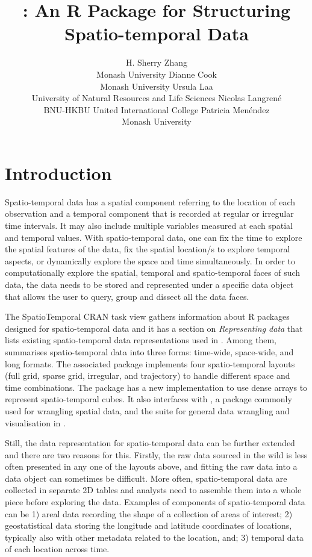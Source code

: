 \documentclass[
]{jss}
\author{
H. Sherry Zhang\\Monash University \And Dianne Cook\\Monash University \AND Ursula Laa\\University of Natural Resources and Life Sciences \AND Nicolas Langrené\\BNU-HKBU United International College \And Patricia Menéndez\\Monash University
}
\title{\pkg{cubble}: An R Package for Structuring Spatio-temporal Data}
\begin{document}
\newpage

\hypertarget{introduction}{%
\section{Introduction}\label{introduction}}

Spatio-temporal data has a spatial component referring to the location of each observation and a temporal component that is recorded at regular or irregular time intervals. It may also include multiple variables measured at each spatial and temporal values. With spatio-temporal data, one can fix the time to explore the spatial features of the data, fix the spatial location/s to explore temporal aspects, or dynamically explore the space and time simultaneously.
In order to computationally explore the spatial, temporal and spatio-temporal faces of such data, the data needs to be stored and represented under a specific data object that allows the user to query, group and dissect all the data faces.

The SpatioTemporal CRAN task view \citep{ctvspatiotemporal} gathers information about R packages designed for spatio-temporal data and it has a section on \emph{Representing data} that lists existing spatio-temporal data representations used in . Among them, \citet{spacetime} summarises spatio-temporal data into three forms: time-wide, space-wide, and long formats. The associated package  \citep{spacetime} implements four spatio-temporal layouts (full grid, sparse grid, irregular, and trajectory) to handle different space and time combinations. The  \citep{stars} package has a new implementation to use dense arrays to represent spatio-temporal cubes. It also interfaces with  \citep{sf}, a package commonly used for wrangling spatial data, and the  \citep{tidyverse} suite for general data wrangling and visualisation in .

Still, the data representation for spatio-temporal data can be further extended and there are two reasons for this. Firstly, the raw data sourced in the wild is less often presented in any one of the layouts above, and fitting the raw data into a data object can sometimes be difficult. More often, spatio-temporal data are collected in separate 2D tables and analysts need to assemble them into a whole piece before exploring the data. Examples of components of spatio-temporal data can be 1) areal data recording the shape of a collection of areas of interest; 2) geostatistical data storing the longitude and latitude coordinates of locations, typically also with other metadata related to the location, and; 3) temporal data of each location across time.
\end{document}

